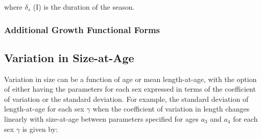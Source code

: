 \documentclass[11pt,
  english,
  letterpaper,
]{article}
\begin{document}
\leavevmode\tagmcend\tagstructend\par


where {\(\delta_s\)\leavevmode\tagmcend\tagstructend} (I) is the duration of the season.

\leavevmode\tagmcend\tagstructend\par


\hypertarget{additional-growth-functional-forms}{%
\subsubsection{Additional Growth Functional Forms}\label{additional-growth-functional-forms}}

\leavevmode\tagmcend\tagstructend


\hypertarget{variation-in-size-at-age}{%
\subsection{Variation in Size-at-Age}\label{variation-in-size-at-age}}

\leavevmode\tagmcend\tagstructend


Variation in size can be a function of age or mean length-at-age, with the option of either having the parameters for each sex expressed in terms of the coefficient of variation or the standard deviation. For example, the standard deviation of length-at-age for each sex {\(\gamma\)\leavevmode\tagmcend\tagstructend} when the coefficient of variation in length changes linearly with size-at-age between parameters specified for ages {\(a_3\)\leavevmode\tagmcend\tagstructend} and {\(a_4\)\leavevmode\tagmcend\tagstructend} for each sex {\(\gamma\)\leavevmode\tagmcend\tagstructend} is given by:

\leavevmode\tagmcend\tagstructend\par

\end{document}
